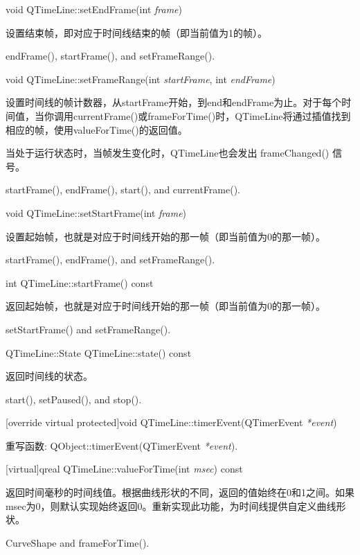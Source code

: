 void QTimeLine::setEndFrame(int \emph{frame})

设置结束帧，即对应于时间线结束的帧（即当前值为1的帧）。

\begin{seeAlso}
endFrame(), startFrame(), and setFrameRange().
\end{seeAlso}

void QTimeLine::setFrameRange(int \emph{startFrame}, int \emph{endFrame})

设置时间线的帧计数器，从startFrame开始，到end和endFrame为止。对于每个时间值，当你调用currentFrame()或frameForTime()时，QTimeLine将通过插值找到相应的帧，使用valueForTime()的返回值。

当处于运行状态时，当帧发生变化时，QTimeLine也会发出 frameChanged() 信号。

\begin{seeAlso}
startFrame(), endFrame(), start(), and currentFrame().
\end{seeAlso}

void QTimeLine::setStartFrame(int \emph{frame})

设置起始帧，也就是对应于时间线开始的那一帧（即当前值为0的那一帧）。

\begin{seeAlso}
startFrame(), endFrame(), and setFrameRange().
\end{seeAlso}

int QTimeLine::startFrame() const

返回起始帧，也就是对应于时间线开始的那一帧（即当前值为0的那一帧）。

\begin{seeAlso}
setStartFrame() and setFrameRange().
\end{seeAlso}

QTimeLine::State QTimeLine::state() const

返回时间线的状态。

\begin{seeAlso}
start(), setPaused(), and stop().
\end{seeAlso}

[override virtual protected]void QTimeLine::timerEvent(QTimerEvent \emph{*event})

重写函数: QObject::timerEvent(QTimerEvent \emph{*event}).

[virtual]qreal QTimeLine::valueForTime(int \emph{msec}) const

返回时间毫秒的时间线值。根据曲线形状的不同，返回的值始终在0和1之间。如果msec为0，则默认实现始终返回0。重新实现此功能，为时间线提供自定义曲线形状。

\begin{seeAlso}
CurveShape and frameForTime().
\end{seeAlso}
